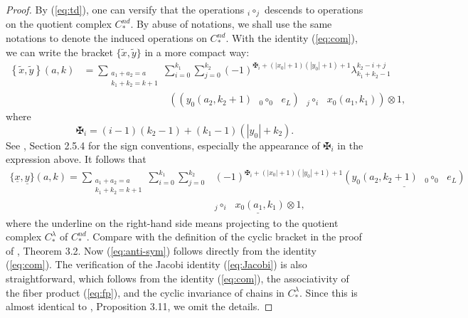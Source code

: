\documentclass[a4paper]{article}
\numberwithin{equation}{section}
\begin{document}
\begin{proof}
By (\ref{eq:td}), one can versify that the operations ${{}_i\circ_j}$ descends to operations on the quotient complex $C_\ast^\mathit{nd}$. By abuse of notations, we shall use the same notations to denote the induced operations on $C_\ast^\mathit{nd}$. With the identity (\ref{eq:com}), we can write the bracket $\{\tilde{x},\tilde{y}\}$ in a more compact way:
\begin{equation}
\begin{split}
\left\{\tilde{x},\tilde{y}\right\}(a,k)&=\sum_{\substack{a_1+a_2=a\\k_1+k_2=k+1}}\sum_{i=0}^{k_1}\sum_{j=0}^{k_2}(-1)^{\maltese_i+(|x_0|+1)(|y_0|+1)+1}\lambda_{k_1+k_2-1}^{k_2-i+j} \\
&\;\;\;\;\;\;\;\;\;\;\;\;\;\;\;\;\;\;\;\;\;\;\;\;\;\;\;\;\;\;\;\left((y_0(a_2,k_2+1)\textrm{ }{{}_0\circ_0}\textrm{ }e_L)\textrm{ }{{}_j\circ_i}\textrm{ }x_0(a_1,k_1)\right)\otimes1,
\end{split}
\end{equation}
where
\begin{equation}
\maltese_i=(i-1)(k_2-1)+(k_1-1)(|y_0|+k_2).
\end{equation}
See \cite{ki1}, Section 2.5.4 for the sign conventions, especially the appearance of $\maltese_i$ in the expression above. It follows that
\begin{equation}
\begin{split}
\{\underline{x},\underline{y}\}(a,k)=\sum_{\substack{a_1+a_2=a\\k_1+k_2=k+1}}\sum_{i=0}^{k_1}\sum_{j=0}^{k_2}&(-1)^{\maltese_i+(|x_0|+1)(|y_0|+1)+1}\underline{(y_0(a_2,k_2+1)\textrm{ }{{}_0\circ_0}\textrm{ }e_L)} \\
&\underline{{{}_j\circ_i}\textrm{ }x_0(a_1,k_1)\otimes1},
\end{split}
\end{equation}
where the underline on the right-hand side means projecting to the quotient complex $C_\ast^\lambda$ of $C_\ast^\mathit{nd}$. Compare with the definition of the cyclic bracket in the proof of \cite{bw}, Theorem 3.2. Now (\ref{eq:anti-sym}) follows directly from the identity (\ref{eq:com}). The verification of the Jacobi identity (\ref{eq:Jacobi}) is also straightforward, which follows from the identity (\ref{eq:com}), the associativity of the fiber product (\ref{eq:fp}), and the cyclic invariance of chains in $C_\ast^\lambda$. Since this is almost identical to \cite{kwz}, Proposition 3.11, we omit the details.
\end{proof}
\end{document}
